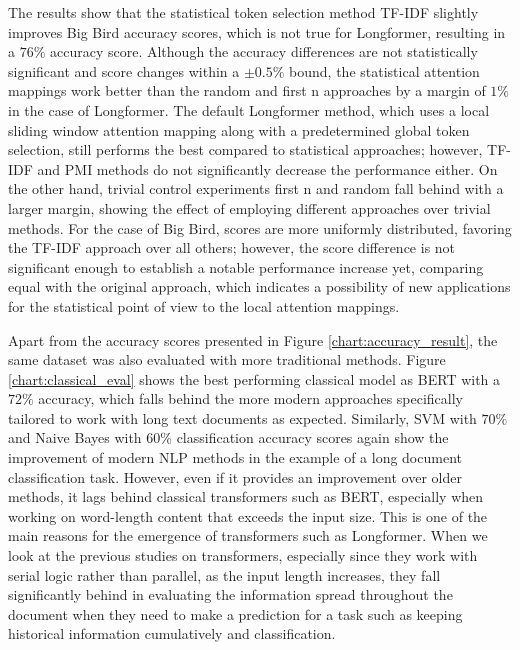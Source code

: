 \documentclass{iyte}
\begin{document}
The results show that the statistical token selection method TF-IDF slightly improves Big Bird accuracy scores, which is not true for Longformer, resulting in a $76\%$ accuracy score. Although the accuracy differences are not statistically significant and score changes within a $\pm 0.5\%$ bound, the statistical attention mappings work better than the random and first n approaches by a margin of $1\%$ in the case of Longformer. The default Longformer method, which uses a local sliding window attention mapping along with a predetermined global token selection, still performs the best compared to statistical approaches; however, TF-IDF and PMI methods do not significantly decrease the performance either. On the other hand, trivial control experiments first n and random fall behind with a larger margin, showing the effect of employing different approaches over trivial methods. For the case of Big Bird, scores are more uniformly distributed, favoring the TF-IDF approach over all others; however, the score difference is not significant enough to establish a notable performance increase yet, comparing equal with the original approach, which indicates a possibility of new applications for the statistical point of view to the local attention mappings.

Apart from the accuracy scores presented in Figure \ref{chart:accuracy_result}, the same dataset was also evaluated with more traditional methods. Figure \ref{chart:classical_eval} shows the best performing classical model as BERT with a $72\%$ accuracy, which falls behind the more modern approaches specifically tailored to work with long text documents as expected. Similarly, SVM with $70\%$ and Naive Bayes with $60\%$ classification accuracy scores again show the improvement of modern NLP methods in the example of a long document classification task. However, even if it provides an improvement over older methods, it lags behind classical transformers such as BERT, especially when working on word-length content that exceeds the input size. This is one of the main reasons for the emergence of transformers such as Longformer. When we look at the previous studies on transformers, especially since they work with serial logic rather than parallel, as the input length increases, they fall significantly behind in evaluating the information spread throughout the document when they need to make a prediction for a task such as keeping historical information cumulatively and classification.
\end{document}
